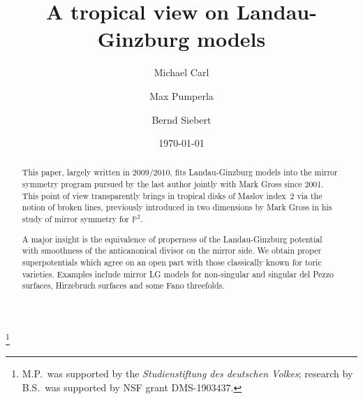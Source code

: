 \documentclass[11pt,letter]{amsart}
\theoremstyle{definition}
\theoremstyle{remark}
\numberwithin{equation}{section}
\numberwithin{figure}{section}
\newcommand{\PP} {\mathbb{P}}
\begin{document}
\title[Tropical Landau-Ginzburg]{A tropical view on
Landau-Ginzburg models}

\author{Michael Carl}
\address{\tiny Alfred-Delp-Str.~2, 73430 Aalen, Germany}

\author{Max Pumperla} 
\address{\tiny IU Internationale Hochschule, Juri-Gagarin-Ring~152, 99084~Erfurt, Germany\\
Anyscale, Inc., 2080 Addison St Ste 7, Berkeley, CA 94704, USA}

\author{Bernd Siebert} 
\address{\tiny Department of Mathematics, The Univ.\ of Texas at Austin,
2515 Speedway, Austin, TX 78712, USA}


\begin{abstract}
This paper, largely written in 2009/2010, fits Landau-Ginzburg models into the
mirror symmetry program pursued by the last author jointly with Mark Gross since
2001. This point of view transparently brings in tropical disks of Maslov
index~$2$ via the notion of broken lines, previously introduced
in two dimensions by Mark Gross in his study of mirror symmetry for $\PP^2$.

A major insight is the equivalence of properness of the Landau-Ginzburg
potential with smoothness of the anticanonical divisor on the mirror side. We
obtain proper superpotentials which agree on an open part with those classically
known for toric varieties. Examples include mirror LG models for non-singular
and singular del Pezzo surfaces, Hirzebruch surfaces and some Fano threefolds.
\end{abstract}

\thanks{M.P.\ was supported by the \emph{Studienstiftung des
deutschen Volkes}; research by B.S.\ was supported by NSF grant DMS-1903437.}


\date{\today}
\maketitle


\tableofcontents

\end{document}

